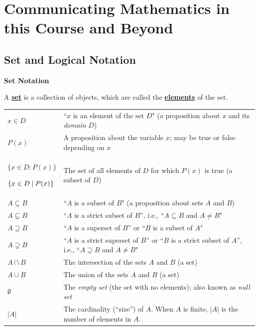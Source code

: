 \documentclass[11pt]{article}
\newcommand\st{:}
\renewcommand\emph[1]{\underline{\bf{#1}}} %
\theoremstyle{definition}
\begin{document}
\newpage \section{Communicating Mathematics in this Course and Beyond}\label{section: communicating mathematics}

\subsection{Set and Logical Notation}



{\bf Set Notation}

 A \emph{set} is a collection of objects, which are called the \emph{elements} of the set.


\vspace*{8pt}
\begin{tabular}{L{1in}L{5in}}
$x\in D$ & ``$x$ is an element of the set $D$"  (a proposition about $x$ and its {\it domain} $D$)\\

$P(x)$ & A proposition about the variable $x$; may be true or false depending on $x$ \\

$\{x \in D\st P(x)\}$ 

$\{x\in D \hspace*{2.5pt}|\hspace*{2.5pt} P(x)\hspace*{.25pt}\}$ & The set of all elements of $D$ for which $P(x)$ is true (a subset of $D$)\\ 

$A \subseteq B$ & ``$A$ is a subset of $B$"  (a proposition about sets $A$ and $B$)\\

$A \subsetneq B$ & ``$A$ is a strict subset of $B$'', i.e., ``$A\subseteq B$ and $A \neq B$" \\
$A \supseteq B$ & ``$A$ is a superset of $B$'' or ``$B$ is a subset of $A$" \\

$A \supsetneq B$ &  ``$A$ is a strict superset of $B$'' or ``$B$ is a strict subset of $A$'',  i.e., ``$A\supseteq B$ and $A \neq B$"   \\ 


$A \cap B$ & The intersection of the sets $A$ and $B$  (a set)\\

$A \cup B$ & The union of the sets $A$ and $B$  (a set)\\

$\emptyset$ & The {\it empty set} (the set with no elements); also known as {\it null set}\\
$|A|$ & The cardinality (``size'') of $A$. When $A$ is finite, $|A|$ is the number of elements in $A$.
\end{tabular}
\end{document}
